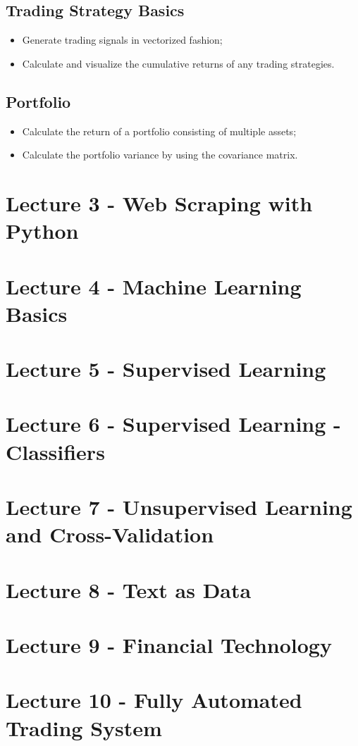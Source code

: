 \documentclass[11pt,a4paper]{report}
\begin{document}
\section{Trading Strategy Basics}
\begin{itemize}
    \item Generate trading signals in vectorized fashion;
    \item Calculate and visualize the cumulative returns of any trading strategies.
\end{itemize}
\section{Portfolio}
\begin{itemize}
    \item Calculate the return of a portfolio consisting of multiple assets;
    \item Calculate the portfolio variance by using the covariance matrix.
\end{itemize}




\chapter{Lecture 3 - Web Scraping with Python}
\chapter{Lecture 4 - Machine Learning Basics}
\chapter{Lecture 5 - Supervised Learning}
\chapter{Lecture 6 - Supervised Learning - Classifiers}
\chapter{Lecture 7 - Unsupervised Learning and Cross-Validation}
\chapter{Lecture 8 - Text as Data}
\chapter{Lecture 9 - Financial Technology}
\chapter{Lecture 10 - Fully Automated Trading System}
\end{document}
